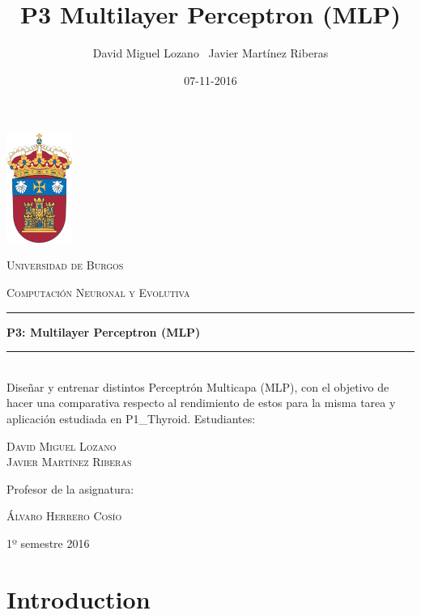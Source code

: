 \documentclass[a4paper,12pt,titlepage]{article}
\newcommand{\HRule}[1]{\rule{\linewidth}{#1}}
\begin{document}
\author{David Miguel Lozano \ Javier Martínez Riberas}
\title{P3 Multilayer Perceptron (MLP)}
\date{07-11-2016}

\begin{titlepage}
	\centering
	\includegraphics[width=0.16\textwidth]{ubu-logo.png}\par
	\vspace{0.3cm}
	{\scshape\LARGE Universidad de Burgos \par}
	\vfill
	{\scshape\Large Computación Neuronal y Evolutiva \par}
	\HRule{2pt}
	{\huge\bfseries P3: Multilayer Perceptron (MLP) \par}
	\HRule{2pt}
	\\ [0.5cm]
	{Diseñar y entrenar distintos Perceptrón Multicapa (MLP), con el objetivo de hacer una comparativa respecto al rendimiento de estos para la misma tarea y aplicación estudiada en P1\_Thyroid.}
	\vfill
	Estudiantes:\par
	{\Large\scshape David Miguel Lozano \\ Javier Martínez Riberas \par}
	\vfill
	Profesor de la asignatura:\par
	\textsc{Álvaro Herrero Cosío}
	\vfill
	{\large 1º semestre 2016 \par}
\end{titlepage}

\newpage
\tableofcontents
\begin{appendix}
\end{appendix}

\newpage

\section{Introduction}
\end{document}
